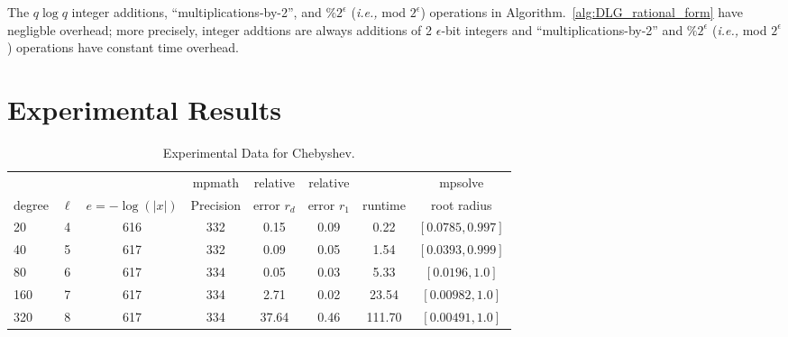 \documentclass[sigconf]{acmart}
\begin{document}
\begin{theorem}
The $q \log q$  integer additions, ``multiplications-by-2'', and $ \%2^\epsilon $ (\emph{i.e.,} mod $ 2^\epsilon $) operations in Algorithm.~\ref{alg:DLG_rational_form} have negligble overhead; more precisely, integer addtions are always additions of 2 $\epsilon$-bit integers and ``multiplications-by-2'' and $ \%2^\epsilon $ (\emph{i.e.,} mod $ 2^\epsilon $) operations have constant time overhead.
\end{theorem}
\section{Experimental Results}

\begin{table}[t]
\caption{Experimental Data for Chebyshev.}
\label{tab:chebyshev}
\vskip 0.15in
\begin{center}
\begin{small}
\begin{sc}
\begin{tabular}{lccccccc}
\toprule
&  &  & mpmath & relative  & relative &  & mpsolve \\
degree  & $\ell$& $e=-\log(|x|)$& Precision &error $r_d$       & error $r_1$ &runtime& root radius\\
\midrule
 20   & 4 & 616 & 332 & 0.15 & 0.09 & 0.22 &  $[0.0785, 0.997]$ \\
 40   & 5 & 617 & 332 & 0.09 & 0.05 & 1.54 & $[0.0393, 0.999]$ \\
 80   & 6 & 617 & 334 & 0.05 & 0.03 & 5.33 & $[0.0196, 1.0]$ \\
 160 & 7 & 617 & 334 & 2.71 & 0.02 & 23.54 & $[0.00982, 1.0]$ \\
 320 & 8 & 617 & 334 & 37.64 & 0.46 & 111.70 & $[0.00491, 1.0]$ \\
\bottomrule
\end{tabular}
\end{sc}
\end{small}
\end{center}
\vskip -0.1in
\end{table}
\end{document}
